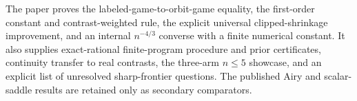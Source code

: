 The paper proves the labeled-game-to-orbit-game equality, the first-order constant and contrast-weighted rule, the explicit universal clipped-shrinkage improvement, and an internal \(n^{-4/3}\) converse with a finite numerical constant. It also supplies exact-rational finite-program procedure and prior certificates, continuity transfer to real contrasts, the three-arm \(n\leq5\) showcase, and an explicit list of unresolved sharp-frontier questions. The published Airy and scalar-saddle results are retained only as secondary comparators.